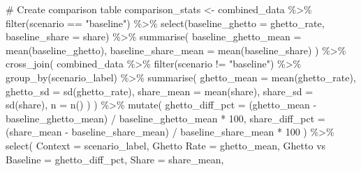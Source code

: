 \documentclass[
  11pt,
]{article}
\newenvironment{Shaded}{\begin{snugshade}}{\end{snugshade}}
\newcommand{\AttributeTok}[1]{\textcolor[rgb]{0.40,0.45,0.13}{#1}}
\newcommand{\CommentTok}[1]{\textcolor[rgb]{0.37,0.37,0.37}{#1}}
\newcommand{\DecValTok}[1]{\textcolor[rgb]{0.68,0.00,0.00}{#1}}
\newcommand{\FunctionTok}[1]{\textcolor[rgb]{0.28,0.35,0.67}{#1}}
\newcommand{\NormalTok}[1]{\textcolor[rgb]{0.00,0.23,0.31}{#1}}
\newcommand{\OtherTok}[1]{\textcolor[rgb]{0.00,0.23,0.31}{#1}}
\newcommand{\SpecialCharTok}[1]{\textcolor[rgb]{0.37,0.37,0.37}{#1}}
\newcommand{\StringTok}[1]{\textcolor[rgb]{0.13,0.47,0.30}{#1}}
\begin{document}
\begin{Shaded}
\begin{Highlighting}[]
\CommentTok{\# Create comparison table}
\NormalTok{comparison\_stats }\OtherTok{\textless{}{-}}\NormalTok{ combined\_data }\SpecialCharTok{\%\textgreater{}\%}
  \FunctionTok{filter}\NormalTok{(scenario }\SpecialCharTok{==} \StringTok{"baseline"}\NormalTok{) }\SpecialCharTok{\%\textgreater{}\%}
  \FunctionTok{select}\NormalTok{(}\AttributeTok{baseline\_ghetto =}\NormalTok{ ghetto\_rate, }\AttributeTok{baseline\_share =}\NormalTok{ share) }\SpecialCharTok{\%\textgreater{}\%}
  \FunctionTok{summarise}\NormalTok{(}
    \AttributeTok{baseline\_ghetto\_mean =} \FunctionTok{mean}\NormalTok{(baseline\_ghetto),}
    \AttributeTok{baseline\_share\_mean =} \FunctionTok{mean}\NormalTok{(baseline\_share)}
\NormalTok{  ) }\SpecialCharTok{\%\textgreater{}\%}
  \FunctionTok{cross\_join}\NormalTok{(}
\NormalTok{    combined\_data }\SpecialCharTok{\%\textgreater{}\%}
      \FunctionTok{filter}\NormalTok{(scenario }\SpecialCharTok{!=} \StringTok{"baseline"}\NormalTok{) }\SpecialCharTok{\%\textgreater{}\%}
      \FunctionTok{group\_by}\NormalTok{(scenario\_label) }\SpecialCharTok{\%\textgreater{}\%}
      \FunctionTok{summarise}\NormalTok{(}
        \AttributeTok{ghetto\_mean =} \FunctionTok{mean}\NormalTok{(ghetto\_rate),}
        \AttributeTok{ghetto\_sd =} \FunctionTok{sd}\NormalTok{(ghetto\_rate),}
        \AttributeTok{share\_mean =} \FunctionTok{mean}\NormalTok{(share),}
        \AttributeTok{share\_sd =} \FunctionTok{sd}\NormalTok{(share),}
        \AttributeTok{n =} \FunctionTok{n}\NormalTok{()}
\NormalTok{      )}
\NormalTok{  ) }\SpecialCharTok{\%\textgreater{}\%}
  \FunctionTok{mutate}\NormalTok{(}
    \AttributeTok{ghetto\_diff\_pct =}\NormalTok{ (ghetto\_mean }\SpecialCharTok{{-}}\NormalTok{ baseline\_ghetto\_mean) }\SpecialCharTok{/}\NormalTok{ baseline\_ghetto\_mean }\SpecialCharTok{*} \DecValTok{100}\NormalTok{,}
    \AttributeTok{share\_diff\_pct =}\NormalTok{ (share\_mean }\SpecialCharTok{{-}}\NormalTok{ baseline\_share\_mean) }\SpecialCharTok{/}\NormalTok{ baseline\_share\_mean }\SpecialCharTok{*} \DecValTok{100}
\NormalTok{  ) }\SpecialCharTok{\%\textgreater{}\%}
  \FunctionTok{select}\NormalTok{(}
    \AttributeTok{Context =}\NormalTok{ scenario\_label,}
    \StringTok{\textasciigrave{}}\AttributeTok{Ghetto Rate}\StringTok{\textasciigrave{}} \OtherTok{=}\NormalTok{ ghetto\_mean,}
    \StringTok{\textasciigrave{}}\AttributeTok{Ghetto vs Baseline}\StringTok{\textasciigrave{}} \OtherTok{=}\NormalTok{ ghetto\_diff\_pct,}
    \StringTok{\textasciigrave{}}\AttributeTok{Share}\StringTok{\textasciigrave{}} \OtherTok{=}\NormalTok{ share\_mean,}

\end{Highlighting}
\end{Shaded}
\end{document}
